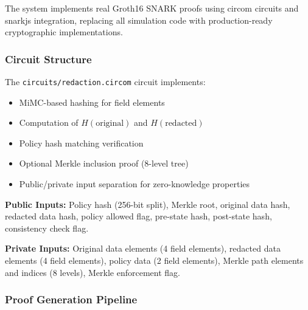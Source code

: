 The system implements real Groth16 SNARK proofs using circom circuits and snarkjs integration, replacing all simulation code with production-ready cryptographic implementations.

\subsubsection{Circuit Structure}

The \texttt{circuits/redaction.circom} circuit implements:
\begin{itemize}
    \item MiMC-based hashing for field elements
    \item Computation of $H(\text{original})$ and $H(\text{redacted})$
    \item Policy hash matching verification
    \item Optional Merkle inclusion proof (8-level tree)
    \item Public/private input separation for zero-knowledge properties
\end{itemize}

\textbf{Public Inputs:} Policy hash (256-bit split), Merkle root, original data hash, redacted data hash, policy allowed flag, pre-state hash, post-state hash, consistency check flag.

\textbf{Private Inputs:} Original data elements (4 field elements), redacted data elements (4 field elements), policy data (2 field elements), Merkle path elements and indices (8 levels), Merkle enforcement flag.

\subsubsection{Proof Generation Pipeline}

